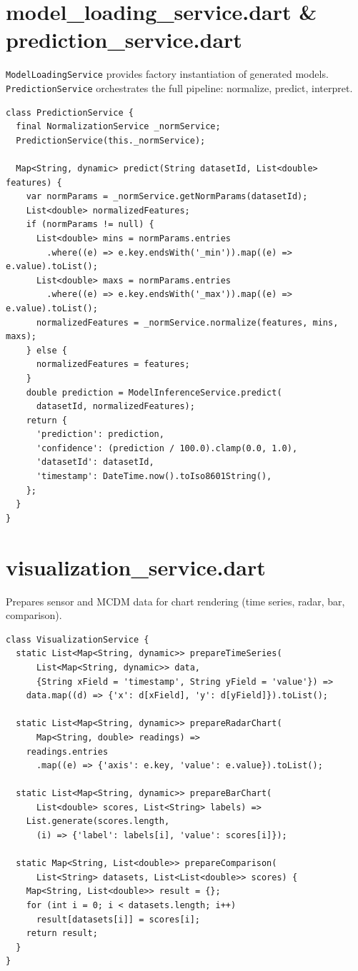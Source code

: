 \documentclass[12pt,a4paper,oneside]{report}
\begin{document}
\section{model\_loading\_service.dart \& prediction\_service.dart}

\texttt{ModelLoadingService} provides factory instantiation of generated models. \texttt{PredictionService} orchestrates the full pipeline: normalize, predict, interpret.

\begin{lstlisting}[style=dartstyle]
class PredictionService {
  final NormalizationService _normService;
  PredictionService(this._normService);

  Map<String, dynamic> predict(String datasetId, List<double> features) {
    var normParams = _normService.getNormParams(datasetId);
    List<double> normalizedFeatures;
    if (normParams != null) {
      List<double> mins = normParams.entries
        .where((e) => e.key.endsWith('_min')).map((e) => e.value).toList();
      List<double> maxs = normParams.entries
        .where((e) => e.key.endsWith('_max')).map((e) => e.value).toList();
      normalizedFeatures = _normService.normalize(features, mins, maxs);
    } else {
      normalizedFeatures = features;
    }
    double prediction = ModelInferenceService.predict(
      datasetId, normalizedFeatures);
    return {
      'prediction': prediction,
      'confidence': (prediction / 100.0).clamp(0.0, 1.0),
      'datasetId': datasetId,
      'timestamp': DateTime.now().toIso8601String(),
    };
  }
}
\end{lstlisting}

\section{visualization\_service.dart}

Prepares sensor and MCDM data for chart rendering (time series, radar, bar, comparison).

\begin{lstlisting}[style=dartstyle]
class VisualizationService {
  static List<Map<String, dynamic>> prepareTimeSeries(
      List<Map<String, dynamic>> data,
      {String xField = 'timestamp', String yField = 'value'}) =>
    data.map((d) => {'x': d[xField], 'y': d[yField]}).toList();

  static List<Map<String, dynamic>> prepareRadarChart(
      Map<String, double> readings) =>
    readings.entries
      .map((e) => {'axis': e.key, 'value': e.value}).toList();

  static List<Map<String, dynamic>> prepareBarChart(
      List<double> scores, List<String> labels) =>
    List.generate(scores.length,
      (i) => {'label': labels[i], 'value': scores[i]});

  static Map<String, List<double>> prepareComparison(
      List<String> datasets, List<List<double>> scores) {
    Map<String, List<double>> result = {};
    for (int i = 0; i < datasets.length; i++)
      result[datasets[i]] = scores[i];
    return result;
  }
}
\end{lstlisting}
\end{document}
